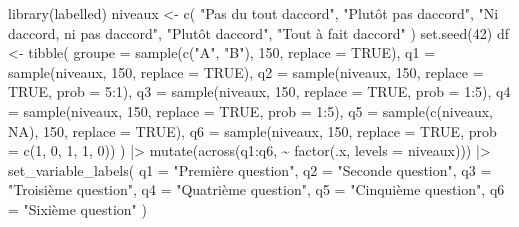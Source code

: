 \documentclass[
  letterpaper,
  DIV=11,
  numbers=noendperiod,
  oneside]{scrreprt}
\newenvironment{Shaded}{\begin{snugshade}}{\end{snugshade}}
\newcommand{\AttributeTok}[1]{\textcolor[rgb]{0.40,0.45,0.13}{#1}}
\newcommand{\ConstantTok}[1]{\textcolor[rgb]{0.56,0.35,0.01}{#1}}
\newcommand{\DecValTok}[1]{\textcolor[rgb]{0.68,0.00,0.00}{#1}}
\newcommand{\FunctionTok}[1]{\textcolor[rgb]{0.28,0.35,0.67}{#1}}
\newcommand{\NormalTok}[1]{\textcolor[rgb]{0.00,0.23,0.31}{#1}}
\newcommand{\OtherTok}[1]{\textcolor[rgb]{0.00,0.23,0.31}{#1}}
\newcommand{\SpecialCharTok}[1]{\textcolor[rgb]{0.37,0.37,0.37}{#1}}
\newcommand{\StringTok}[1]{\textcolor[rgb]{0.13,0.47,0.30}{#1}}
\begin{document}
\begin{Shaded}
\begin{Highlighting}[]
\FunctionTok{library}\NormalTok{(labelled)}
\NormalTok{niveaux }\OtherTok{\textless{}{-}} \FunctionTok{c}\NormalTok{(}
  \StringTok{"Pas du tout d\textquotesingle{}accord"}\NormalTok{,}
  \StringTok{"Plutôt pas d\textquotesingle{}accord"}\NormalTok{,}
  \StringTok{"Ni d\textquotesingle{}accord, ni pas d\textquotesingle{}accord"}\NormalTok{,}
  \StringTok{"Plutôt d\textquotesingle{}accord"}\NormalTok{,}
  \StringTok{"Tout à fait d\textquotesingle{}accord"}
\NormalTok{)}
\FunctionTok{set.seed}\NormalTok{(}\DecValTok{42}\NormalTok{)}
\NormalTok{df }\OtherTok{\textless{}{-}}
  \FunctionTok{tibble}\NormalTok{(}
    \AttributeTok{groupe =} \FunctionTok{sample}\NormalTok{(}\FunctionTok{c}\NormalTok{(}\StringTok{"A"}\NormalTok{, }\StringTok{"B"}\NormalTok{), }\DecValTok{150}\NormalTok{, }\AttributeTok{replace =} \ConstantTok{TRUE}\NormalTok{),}
    \AttributeTok{q1 =} \FunctionTok{sample}\NormalTok{(niveaux, }\DecValTok{150}\NormalTok{, }\AttributeTok{replace =} \ConstantTok{TRUE}\NormalTok{),}
    \AttributeTok{q2 =} \FunctionTok{sample}\NormalTok{(niveaux, }\DecValTok{150}\NormalTok{, }\AttributeTok{replace =} \ConstantTok{TRUE}\NormalTok{, }\AttributeTok{prob =} \DecValTok{5}\SpecialCharTok{:}\DecValTok{1}\NormalTok{),}
    \AttributeTok{q3 =} \FunctionTok{sample}\NormalTok{(niveaux, }\DecValTok{150}\NormalTok{, }\AttributeTok{replace =} \ConstantTok{TRUE}\NormalTok{, }\AttributeTok{prob =} \DecValTok{1}\SpecialCharTok{:}\DecValTok{5}\NormalTok{),}
    \AttributeTok{q4 =} \FunctionTok{sample}\NormalTok{(niveaux, }\DecValTok{150}\NormalTok{, }\AttributeTok{replace =} \ConstantTok{TRUE}\NormalTok{, }\AttributeTok{prob =} \DecValTok{1}\SpecialCharTok{:}\DecValTok{5}\NormalTok{),}
    \AttributeTok{q5 =} \FunctionTok{sample}\NormalTok{(}\FunctionTok{c}\NormalTok{(niveaux, }\ConstantTok{NA}\NormalTok{), }\DecValTok{150}\NormalTok{, }\AttributeTok{replace =} \ConstantTok{TRUE}\NormalTok{),}
    \AttributeTok{q6 =} \FunctionTok{sample}\NormalTok{(niveaux, }\DecValTok{150}\NormalTok{, }\AttributeTok{replace =} \ConstantTok{TRUE}\NormalTok{, }\AttributeTok{prob =} \FunctionTok{c}\NormalTok{(}\DecValTok{1}\NormalTok{, }\DecValTok{0}\NormalTok{, }\DecValTok{1}\NormalTok{, }\DecValTok{1}\NormalTok{, }\DecValTok{0}\NormalTok{))}
\NormalTok{  ) }\SpecialCharTok{|\textgreater{}} 
  \FunctionTok{mutate}\NormalTok{(}\FunctionTok{across}\NormalTok{(q1}\SpecialCharTok{:}\NormalTok{q6, }\SpecialCharTok{\textasciitilde{}} \FunctionTok{factor}\NormalTok{(.x, }\AttributeTok{levels =}\NormalTok{ niveaux))) }\SpecialCharTok{|\textgreater{}} 
  \FunctionTok{set\_variable\_labels}\NormalTok{(}
    \AttributeTok{q1 =} \StringTok{"Première question"}\NormalTok{,}
    \AttributeTok{q2 =} \StringTok{"Seconde question"}\NormalTok{,}
    \AttributeTok{q3 =} \StringTok{"Troisième question"}\NormalTok{,}
    \AttributeTok{q4 =} \StringTok{"Quatrième question"}\NormalTok{,}
    \AttributeTok{q5 =} \StringTok{"Cinquième question"}\NormalTok{,}
    \AttributeTok{q6 =} \StringTok{"Sixième question"}
\NormalTok{  )}
\end{Highlighting}
\end{Shaded}
\end{document}
